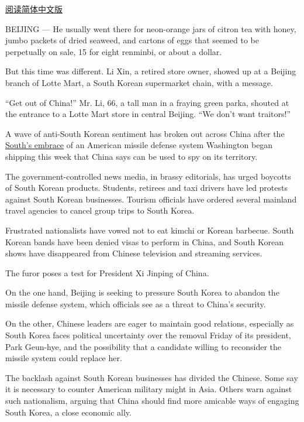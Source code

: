 \href{http://cn.nytimes.com/china/20170310/china-lotte-thaad-south-korea/}{阅读简体中文版}

BEIJING --- He usually went there for neon-orange jars of citron tea
with honey, jumbo packets of dried seaweed, and cartons of eggs that
seemed to be perpetually on sale, 15 for eight renminbi, or about a
dollar.

But this time was different. Li Xin, a retired store owner, showed up at
a Beijing branch of Lotte Mart, a South Korean supermarket chain, with a
message.

``Get out of China!'' Mr. Li, 66, a tall man in a fraying green parka,
shouted at the entrance to a Lotte Mart store in central Beijing. ``We
don't want traitors!''

A wave of anti-South Korean sentiment has broken out across China after
the
\href{https://www.nytimes.com/2017/03/06/world/asia/north-korea-thaad-missile-defense-us-china.html}{South's
embrace} of an American missile defense system Washington began shipping
this week that China says can be used to spy on its territory.

The government-controlled news media, in brassy editorials, has urged
boycotts of South Korean products. Students, retirees and taxi drivers
have led protests against South Korean businesses. Tourism officials
have ordered several mainland travel agencies to cancel group trips to
South Korea.

Frustrated nationalists have vowed not to eat kimchi or Korean barbecue.
South Korean bands have been denied visas to perform in China, and South
Korean shows have disappeared from Chinese television and streaming
services.

The furor poses a test for President Xi Jinping of China.

On the one hand, Beijing is seeking to pressure South Korea to abandon
the missile defense system, which officials see as a threat to China's
security.

On the other, Chinese leaders are eager to maintain good relations,
especially as South Korea faces political uncertainty over the removal
Friday of its president, Park Geun-hye, and the possibility that a
candidate willing to reconsider the missile system could replace her.

The backlash against South Korean businesses has divided the Chinese.
Some say it is necessary to counter American military might in Asia.
Others warn against such nationalism, arguing that China should find
more amicable ways of engaging South Korea, a close economic ally.

